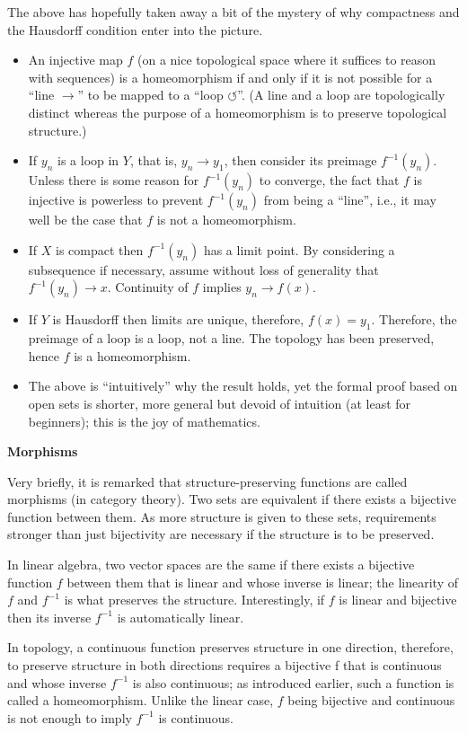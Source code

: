 \documentclass[a4paper,11pt]{article}
\begin{document}
The above has hopefully taken away a bit of the mystery of why
compactness and the Hausdorff condition enter into the picture.
\begin{itemize}
\item An injective map $f$ (on a nice topological space where it
  suffices to reason with sequences) is a homeomorphism if and only if
  it is not possible for a ``line $\longrightarrow$'' to be mapped to
  a ``loop $\circlearrowleft$''. (A line and a loop are topologically
  distinct whereas the purpose of a homeomorphism is to preserve
  topological structure.)
\item If $y_n$ is a loop in $Y$, that is, $y_n \rightarrow y_1$, then
  consider its preimage $f^{-1}(y_n)$. Unless there is some reason for
  $f^{-1}(y_n)$ to converge, the fact that $f$ is injective is
  powerless to prevent $f^{-1}(y_n)$ from being a ``line'', i.e., it
  may well be the case that $f$ is not a homeomorphism.
\item If $X$ is compact then $f^{-1}(y_n)$ has a limit point. By
  considering a subsequence if necessary, assume without loss of
  generality that $f^{-1}(y_n) \rightarrow x$. Continuity of $f$
  implies $y_n \rightarrow f(x)$.
\item If $Y$ is Hausdorff then limits are unique, therefore, $f(x) =
  y_1$. Therefore, the preimage of a loop is a loop, not a line. The
  topology has been preserved, hence $f$ is a homeomorphism.
\item The above is ``intuitively'' why the result holds, yet the
  formal proof based on open sets is shorter, more general but devoid
  of intuition (at least for beginners); this is the joy of
  mathematics.
\end{itemize}

\textbf{Morphisms}

Very briefly, it is remarked that structure-preserving functions are
called morphisms (in category theory). Two sets are equivalent if
there exists a bijective function between them. As more structure is
given to these sets, requirements stronger than just bijectivity are
necessary if the structure is to be preserved.

In linear algebra, two vector spaces are the same if there exists a
bijective function $f$ between them that is linear and whose inverse
is linear; the linearity of $f$ and $f^{-1}$ is what preserves the
structure. Interestingly, if $f$ is linear and bijective then its
inverse $f^{-1}$ is automatically linear.

In topology, a continuous function preserves structure in one
direction, therefore, to preserve structure in both directions
requires a bijective f that is continuous and whose inverse $f^{-1}$
is also continuous; as introduced earlier, such a function is called a
homeomorphism. Unlike the linear case, $f$ being bijective and
continuous is not enough to imply $f^{-1}$ is continuous.


%
%
%

\printbibliography
\end{document}
